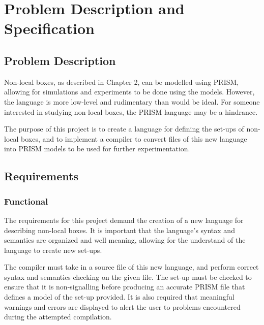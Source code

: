 \documentclass[report.tex]{subfiles}
\begin{document}
\chapter{Problem Description and Specification} %
\label{cha:problem_description_and_specification}


\section{Problem Description} %
\label{sec:problem_description}
Non-local boxes, as described in Chapter 2, can be modelled using PRISM, 
allowing for simulations and experiments to be done using the models. However,
the language is more low-level and rudimentary than would be ideal. For someone
interested in studying non-local boxes, the PRISM language may be a hindrance.

The purpose of this project is to create a language for defining the set-ups of
non-local boxes, and to implement a compiler to convert files of this new
language into PRISM models to be used for further experimentation.


\section{Requirements} %
\label{sec:requirements}

\subsection{Functional} %
\label{sub:functional}
The requirements for this project demand the creation of a new language for
describing non-local boxes. It is important that the language's syntax and
semantics are organized and well meaning, allowing for the understand of the
language to create new set-ups.

The compiler must take in a source file of this new language, and perform
correct syntax and semantics checking on the given file. The set-up must be
checked to ensure that it is non-signalling before producing an accurate PRISM
file that defines a model of the set-up provided. It is also required that
meaningful warnings and errors are displayed to alert the user to problems
encountered during the attempted compilation.
\end{document}
